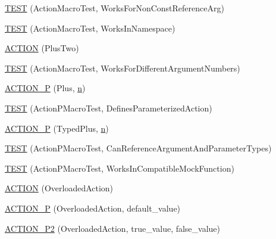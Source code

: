 \begin{DoxyCompactItemize}
\item 
\hyperlink{namespacetesting_1_1gmock__generated__actions__test_a093a824ac7e8ec775a8f5d7b11d223a9}{T\+E\+ST} (Action\+Macro\+Test, Works\+For\+Non\+Const\+Reference\+Arg)
\item 
\hyperlink{namespacetesting_1_1gmock__generated__actions__test_af75a9a5b9d6a1cf718a58f030a5a9133}{T\+E\+ST} (Action\+Macro\+Test, Works\+In\+Namespace)
\item 
\hyperlink{namespacetesting_1_1gmock__generated__actions__test_a0eef2f885ccb1e4fac88a910f0fc5c2e}{A\+C\+T\+I\+ON} (Plus\+Two)
\item 
\hyperlink{namespacetesting_1_1gmock__generated__actions__test_acb98f6208678d9f5500a0c2c095b8cd0}{T\+E\+ST} (Action\+Macro\+Test, Works\+For\+Different\+Argument\+Numbers)
\item 
\hyperlink{namespacetesting_1_1gmock__generated__actions__test_ac081154b3ae2f099bd5be853cacfdaa4}{A\+C\+T\+I\+O\+N\+\_\+P} (Plus, \hyperlink{app_2main_8cpp_acfc02ec89670db29251fda6a66602ce2}{n})
\item 
\hyperlink{namespacetesting_1_1gmock__generated__actions__test_a42a5fe606ca18b2eb1e5d7884045118f}{T\+E\+ST} (Action\+P\+Macro\+Test, Defines\+Parameterized\+Action)
\item 
\hyperlink{namespacetesting_1_1gmock__generated__actions__test_a3bcd440e11ab64ad5eb007efce33cf7d}{A\+C\+T\+I\+O\+N\+\_\+P} (Typed\+Plus, \hyperlink{app_2main_8cpp_acfc02ec89670db29251fda6a66602ce2}{n})
\item 
\hyperlink{namespacetesting_1_1gmock__generated__actions__test_a4262c10efb367abf9771b3060c57d190}{T\+E\+ST} (Action\+P\+Macro\+Test, Can\+Reference\+Argument\+And\+Parameter\+Types)
\item 
\hyperlink{namespacetesting_1_1gmock__generated__actions__test_ab545244777c7559d1b0c2c63ee2be134}{T\+E\+ST} (Action\+P\+Macro\+Test, Works\+In\+Compatible\+Mock\+Function)
\item 
\hyperlink{namespacetesting_1_1gmock__generated__actions__test_a24927d97882dc1d52e203720df804188}{A\+C\+T\+I\+ON} (Overloaded\+Action)
\item 
\hyperlink{namespacetesting_1_1gmock__generated__actions__test_a1ee92e8b8bd6a5a54f5d2fcdb9f122b8}{A\+C\+T\+I\+O\+N\+\_\+P} (Overloaded\+Action, default\+\_\+value)
\item 
\hyperlink{namespacetesting_1_1gmock__generated__actions__test_a233ee874462c7956e154945975da1127}{A\+C\+T\+I\+O\+N\+\_\+\+P2} (Overloaded\+Action, true\+\_\+value, false\+\_\+value)
\item 

\end{DoxyCompactItemize}
